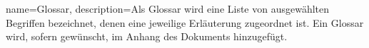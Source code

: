 {
	name=Glossar,
	description={Als Glossar wird eine Liste von ausgewählten Begriffen bezeichnet, denen eine jeweilige Erläuterung zugeordnet ist. Ein Glossar wird, sofern gewünscht, im Anhang des Dokuments hinzugefügt.}
}